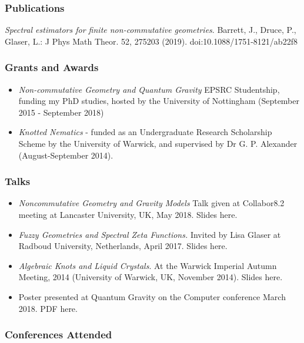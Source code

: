 \documentclass[10pt]{article}
\providecommand{\tightlist}{%
  \setlength{\itemsep}{0pt}\setlength{\parskip}{0pt}}
\begin{document}
\subsubsection{Publications}\label{publications}

\emph{Spectral estimators for finite non-commutative geometries}.
Barrett, J., Druce, P., Glaser, L.: J Phys Math Theor. 52, 275203
(2019). doi:10.1088/1751-8121/ab22f8

\subsubsection{Grants and Awards}\label{grants-and-awards}

\begin{itemize}
\tightlist
\item
  \emph{Non-commutative Geometry and Quantum Gravity} EPSRC Studentship,
  funding my PhD studies, hosted by the University of Nottingham
  (September 2015 - September 2018)
\item
  \emph{Knotted Nematics} - funded as an Undergraduate Research
  Scholarship Scheme by the University of Warwick, and supervised by Dr
  G. P. Alexander (August-September 2014).
\end{itemize}

\subsubsection{Talks}\label{talks}

\begin{itemize}
\tightlist
\item
  \emph{Noncommutative Geometry and Gravity Models} Talk given at
  Collabor8.2 meeting at Lancaster University, UK, May 2018. Slides
  here. \\
\item
  \emph{Fuzzy Geometries and Spectral Zeta Functions.} Invited by Lisa
  Glaser at Radboud University, Netherlands, April 2017. Slides here. \\
\item
  \emph{Algebraic Knots and Liquid Crystals}. At the Warwick Imperial
  Autumn Meeting, 2014 (University of Warwick, UK, November 2014).
  Slides here. \\
\item
  Poster presented at Quantum Gravity on the Computer conference March
  2018. PDF here.
\end{itemize}

\subsubsection{Conferences Attended}\label{conferences-attended}
\end{document}
